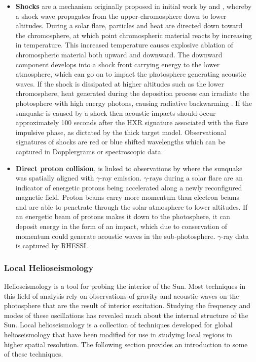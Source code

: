 {\begin{itemize}
\item \textbf{Shocks} are a mechanism originally proposed in initial work by \cite{1995ESASP.376b.341K} and \cite{1998Natur.393..317K}, whereby a shock wave propagates from the upper-chromosphere down to lower altitudes. During a solar flare, particles and heat are directed down toward the chromosphere, at which point chromospheric material reacts by increasing in temperature. This increased temperature causes explosive ablation of chromospheric material both upward and downward. The downward component develops into a shock front carrying energy to the lower atmosphere, which can go on to impact the photosphere generating acoustic waves. If the shock is dissipated at higher altitudes such as the lower chromosphere, heat generated during the deposition process can irradiate the photosphere with high energy photons, causing radiative backwarming \citep{1989SoPh..124..303M}. If the sunquake is caused by a shock then acoustic impacts should occur approximately 100 seconds after the HXR signature associated with the flare impulsive phase, as dictated by the thick target model. Observational signatures of shocks are red or blue shifted wavelengths which can be captured in Dopplergrams or spectroscopic data. \\

\item \textbf{Direct proton collision}, is linked to observations by \cite{2007ApJ...664..573Z} where the sunquake was spatially aligned with $\gamma$-ray emission. $\gamma$-rays during a solar flare are an indicator of energetic protons being accelerated along a newly reconfigured magnetic field. Proton beams carry more momentum than electron beams and are able to penetrate through the solar atmosphere to lower altitudes. If an energetic beam of protons makes it down to the photosphere, it can deposit energy in the form of an impact, which due to conservation of momentum could generate acoustic waves in the sub-photosphere. $\gamma$-ray data is captured by RHESSI. \\

\end{itemize}


\subsubsection{Local Helioseismology}
Helioseismology is a tool for probing the interior of the Sun. Most techniques in this field of analysis rely on observations of gravity and acoustic waves on the photosphere that are the result of interior excitation. Studying the frequency and modes of these oscillations has revealed much about the internal structure of the Sun. Local helioseismology is a collection of techniques developed for global helioseismology that have been modified for use in studying local regions in higher spatial resolution. The following section provides an introduction to some of these techniques.

}

